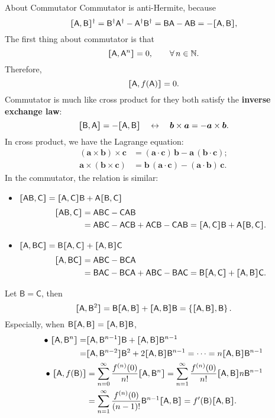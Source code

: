 \documentclass{article}
\def\sA{\mathsf A}\def\sB{\mathsf B}\def\sC{\mathsf C}\def\sX{\mathsf X}\def\sP{\mathsf P}\def\sH{\mathsf H}\def\sK{\mathsf K}\def\sL{\mathsf L}\def\sS{\mathsf S}\def\sM{\mathsf M}\def\sT{\mathsf T}
\newcommand{\ko}[1]{\hspace{-#1 pt}}%
\newcommand{\cmm}[1]{\lfloor\ko{4.45}\lceil #1\rceil\ko{4.45}\rfloor}%
\begin{document}
\begin{theorem}{About Commutator}{}
	Commutator is anti-Hermite, because
	$$\cmm{\sA,\sB}^\dagger= \sB^\dagger\sA^\dagger-\sA^\dagger\sB^\dagger=\sB\sA-\sA\sB=-\cmm{\sA,\sB},$$
	The first thing about commutator is that
	$$\cmm{\sA,\sA^n}=0,\qquad\forall\,n\in\mathbb N.$$
	Therefore, $$\cmm{\sA,f(\sA)}=0.$$\tcblower
	Commutator is much like cross product for they both satisfy the \textbf{inverse exchange law}:
	$$\cmm{\sB,\sA}=-\cmm{\sA,\sB}\quad\leftrightarrow\quad\bm b\times\bm a=-\bm a\times\bm b.$$
	In cross product, we have the Lagrange equation:
	\begin{align*}
		(\bm a\times\bm b)\times\bm c & =(\bm a\cdot\bm c)\,\bm b-\bm a\,(\bm b\cdot\bm c); \\
		\bm a\times(\bm b\times\bm c) & =\bm b\,(\bm a\cdot\bm c)-(\bm a\cdot\bm b)\,\bm c.
	\end{align*}
	In the commutator, the relation is similar:
	\begin{itemize}
		\item $\cmm{\sA\sB,\sC}=\cmm{\sA,\sC}\sB+\sA\cmm{\sB,\sC}$
		      \begin{align*}
			      \cmm{\sA\sB,\sC} & =\sA\sB\sC-\sC\sA\sB                                                        \\
			                       & =\sA\sB\sC-\sA\sC\sB+\sA\sC\sB-\sC\sA\sB=\cmm{\sA,\sC}\sB+\sA\cmm{\sB,\sC}.
		      \end{align*}
		\item $\cmm{\sA,\sB\sC}=\sB\cmm{\sA,\sC}+\cmm{\sA,\sB}\sC$
		      \begin{align*}
			      \cmm{\sA,\sB\sC} & =\sA\sB\sC-\sB\sC\sA                                                        \\
			                       & =\sB\sA\sC-\sB\sC\sA+\sA\sB\sC-\sB\sA\sC=\sB\cmm{\sA,\sC}+\cmm{\sA,\sB}\sC.
		      \end{align*}
	\end{itemize}
	Let $\sB=\sC$, then
	$$\cmm{\sA,\sB^2}=\sB\cmm{\sA,\sB}+\cmm{\sA,\sB}\sB=\left\{\cmm{\sA,\sB},\sB\right\}.$$
	Especially, when $\sB\cmm{\sA,\sB}=\cmm{\sA,\sB}\sB$,
	\begin{align*}
		\bullet~\cmm{\sA,\sB^n}= & \cmm{\sA,\sB^{n-1}}\sB+\cmm{\sA,\sB}\sB^{n-1}                                                                        \\
		=                        & \cmm{\sA,\sB^{n-2}}\sB^2+2\cmm{\sA,\sB}\sB^{n-1}=\cdots=n\cmm{\sA,\sB}\sB^{n-1}                                      \\
		\bullet~\cmm{\sA,f(\sB)} & =\sum_{n=0}^\infty\frac{f^{(n)}(0)}{n!}\cmm{\sA,\sB^n}=\sum_{n=1}^\infty\frac{f^{(n)}(0)}{n!}\cmm{\sA,\sB}n\sB^{n-1} \\
		                         & =\sum_{n=1}^\infty\frac{f^{(n)}(0)}{(n-1)!}\sB^{n-1}\cmm{\sA,\sB}=f'(\sB)\cmm{\sA,\sB}.
	\end{align*}
\end{theorem}
\end{document}

